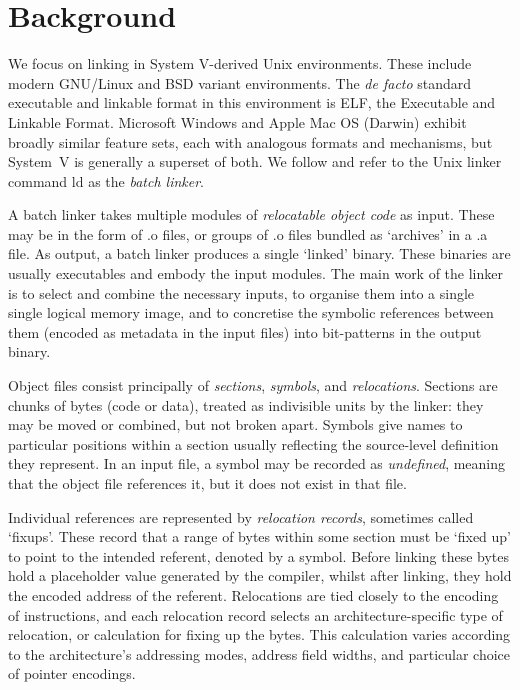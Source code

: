 \documentclass[preprint,10pt]{sigplanconf-pldi16}
\begin{document}
\section{Background}
\label{sec:background}

We focus on linking in System V-derived Unix environments.
These include modern GNU/Linux and BSD variant environments.
The \emph{de facto} standard executable and linkable format in this environment is ELF, the Executable and Linkable Format.
Microsoft Windows and Apple Mac OS (Darwin) exhibit broadly similar feature sets, each with analogous formats and mechanisms, but System~V is generally a superset of both.
We follow \citet{gingell_shared_1987} and refer to the Unix linker command \textsf{ld} as the \emph{batch linker}.

A batch linker takes multiple modules of \emph{relocatable object code} as input.
These may be in the form of \textsf{.o} files, or groups of \textsf{.o} files bundled as `archives' in a \textsf{.a} file.
As output, a batch linker produces a single `linked' binary.
These binaries are usually executables and embody the input modules.
The main work of the linker is to select and combine the necessary inputs, to organise them into a single single logical memory image, and to concretise the symbolic references between them (encoded as metadata in the input files) into bit-patterns in the output binary.

Object files consist principally of \emph{sections}, \emph{symbols}, and \emph{relocations}.
Sections are chunks of bytes (code or data), treated as indivisible units by the linker: they may be moved or combined, but not broken apart. 
Symbols give names to particular positions within a section usually reflecting the source-level definition they represent.
In an input file, a symbol may be recorded as \emph{undefined}, meaning that the object file references it, but it does not exist in that file.

Individual references are represented by \emph{relocation records}, sometimes called `fixups'.
These record that a range of bytes within some section must be `fixed up' to point to the intended referent, denoted by a symbol. 
Before linking these bytes hold a placeholder value generated by the compiler, whilst after linking, they hold the encoded address of the referent.
Relocations are tied closely to the encoding of instructions, and each relocation record selects an architecture-specific type of relocation, or calculation for fixing up the bytes.
This calculation varies according to the architecture's addressing modes, address field widths, and particular choice of pointer encodings.
\end{document}
